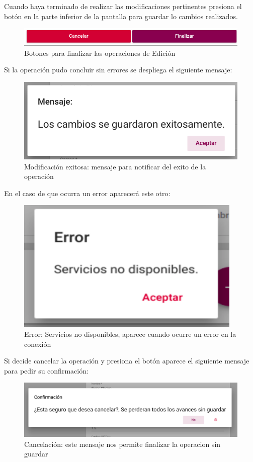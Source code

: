 Cuando haya terminado de realizar las modificaciones pertinentes presiona el botón  en la parte inferior de la pantalla para guardar lo cambios realizados.\\
\begin{figure}[H]
    \centering
    \hypertarget{finalizarBtnE}{\includegraphics[width=0.7\linewidth]{images/GUA/finalizarBtn}}
    \caption{Botones para finalizar las operaciones de Edición}
    \label{finalizarBtnE}
\end{figure}
Si la operación pudo concluir sin errores se despliega el siguiente mensaje:\\
\begin{figure}[H]
    \centering
    \hypertarget{modificacion}{\includegraphics[width=0.7\linewidth]{images/GUA/modificacion}}
    \caption{Modificación exitosa: mensaje para notificar del exito de la operación}
    \label{modificacion}
\end{figure}
En el caso de que ocurra un error aparecerá este otro:\\
\begin{figure}[H]
    \centering
    \hypertarget{errorE}{\includegraphics[width=0.7\linewidth]{images/GUA/error}}
    \caption{Error: Servicios no disponibles, aparece cuando ocurre un error en la conexión}
    \label{errorE}
\end{figure}
Si decide cancelar la operación y presiona el botón  aparece el siguiente mensaje para pedir su confirmación:\\
\begin{figure}[H]
    \centering
    \hypertarget{cancelarE}{\includegraphics[width=0.7\linewidth]{images/GUA/cancelar}}
    \caption{Cancelación: este mensaje nos permite finalizar la operacion sin guardar}
    \label{cancelarE}
\end{figure}
\newpage
